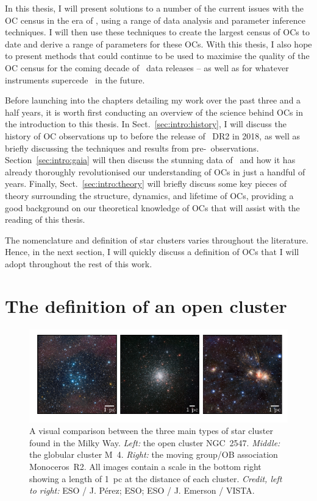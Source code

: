 In this thesis, I will present solutions to a number of the current issues with the OC census in the era of \gaia, using a range of data analysis and parameter inference techniques. I will then use these techniques to create the largest census of OCs to date and derive a range of parameters for these OCs. With this thesis, I also hope to present methods that could continue to be used to maximise the quality of the OC census for the coming decade of \gaia\ data releases -- as well as for whatever instruments supercede \gaia\ in the future.

Before launching into the chapters detailing my work over the past three and a half years, it is worth first conducting an overview of the science behind OCs in the introduction to this thesis. In Sect.~\ref{sec:intro:history}, I will discuss the history of OC observations up to before the release of \gaia\ DR2 in 2018, as well as briefly discussing the techniques and results from pre-\gaia\ observations. Section~\ref{sec:intro:gaia} will then discuss the stunning data of \gaia\ and how it has already thoroughly revolutionised our understanding of OCs in just a handful of years. Finally, Sect.~\ref{sec:intro:theory} will briefly discuss some key pieces of theory surrounding the structure, dynamics, and lifetime of OCs, providing a good background on our theoretical knowledge of OCs that will assist with the reading of this thesis.

The nomenclature and definition of star clusters varies throughout the literature. Hence, in the next section, I will quickly discuss a definition of OCs that I will adopt throughout the rest of this work.


\section{The definition of an open cluster}
\label{sec:intro:definition}

\begin{figure}[tb]
	\includegraphics[width=\textwidth]{fig/c1/oc_gc_mg_comparison.pdf}
	\caption[A visual comparison between the three main types of star cluster found in the Milky Way]{A visual comparison between the three main types of star cluster found in the Milky Way. \emph{Left:} the open cluster NGC~2547. \emph{Middle:} the globular cluster M~4. \emph{Right:} the moving group/OB association Monoceros~R2. All images contain a scale in the bottom right showing a length of 1~pc at the distance of each cluster. \emph{Credit, left to right:} ESO / J. Pérez; ESO; ESO / J. Emerson / VISTA. }
	\label{fig:intro:definition:comparison}
\end{figure}

